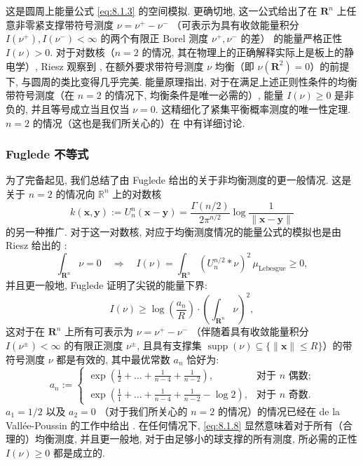 这是圆周上能量公式 \eqref{eq:8.1.3} 的空间模拟. 
更确切地, 这一公式给出了在 \(\mathbf{R}^n\) 上任意非零紧支撑带符号测度 \(\nu = \nu^+ - \nu^-\) 
（可表示为具有收敛能量积分 \(I(\nu^+), I(\nu^-) < \infty\) 的两个有限正 Borel 测度 \(\nu^+, \nu^-\) 的差） 
的能量严格正性 \(I(\nu) > 0\). 
对于对数核（\(n=2\) 的情况, 其在物理上的正确解释实际上是板上的静电学）, 
Riesz 观察到 \cite[第 I.4 节]{Rie38}, 在额外要求带符号测度 \(\nu\) 均衡（即 \(\nu(\mathbf{R}^2) = 0\)）的前提下, 
与圆周的类比变得几乎完美. 
能量原理指出, 对于在满足上述正则性条件的均衡带符号测度（在 \(n=2\) 的情况下, 均衡条件是唯一必需的）, 
能量 \(I(\nu) \geq 0\) 是非负的, 并且等号成立当且仅当 \(\nu=0\). 
这精细化了紧集平衡概率测度的唯一性定理. \(n=2\) 的情况（这也是我们所关心的）在 \cite[定理 16.4.2]{Hil62} 中有详细讨论.

\subsubsection{Fuglede 不等式}\label{sec:8.1.7}

为了完备起见, 我们总结了由 Fuglede \cite{Fug60} 给出的关于非均衡测度的更一般情况. 
这是关于 \(n=2\) 的情况向 \(\mathbb{R}^n\) 上的对数核
\[ k(\mathbf{x}, \mathbf{y}) := U_n^n(\mathbf{x} - \mathbf{y}) = \frac{\Gamma(n/2)}{2\pi^{n/2}} \log \frac{1}{\|\mathbf{x} - \mathbf{y}\|} \]
的另一种推广. 对于这一对数核, 对应于均衡测度情况的能量公式的模拟也是由 Riesz 给出的 \cite[第 I.4 节]{Rie38}:
\[ \int_{\mathbf{R}^n} \nu = 0 \quad \Longrightarrow \quad I(\nu) = \int_{\mathbf{R}^n} \left( U_n^{n/2} * \nu \right)^2 \, \mu_{\text{Lebesgue}} \ge 0, \]
并且更一般地, Fuglede \cite[第 4 节]{Fug60} 证明了尖锐的能量下界:
\begin{equation}\label{eq:8.1.8}
I(\nu) \ge \log\left(\frac{a_n}{R}\right) \cdot \left(\int_{\mathbf{R}^n} \nu\right)^2,
\end{equation}
这对于在 \(\mathbf{R}^n\) 上所有可表示为 \(\nu = \nu^+ - \nu^-\) （伴随着具有收敛能量积分 \(I(\nu^\pm) < \infty\) 的有限正测度 \(\nu^\pm\), 
且具有支撑集 \(\operatorname{supp}(\nu) \subseteq \{\|\mathbf{x}\| \leq R\}\)）的带符号测度 \(\nu\) 都是有效的, 
其中最优常数 \(a_n\) 恰好为:
\[ a_n := \begin{cases} \exp\left(\frac{1}{2} + \dots + \frac{1}{n-4} + \frac{1}{n-2}\right), & \text{对于 } n \text{ 偶数;} \\ \exp\left(\frac{1}{1} + \dots + \frac{1}{n-4} + \frac{1}{n-2} - \log 2\right), & \text{对于 } n \text{ 奇数.} \end{cases} \]
\(a_1 = 1/2\) 以及 \(a_2 = 0\) （对于我们所关心的 \(n = 2\) 的情况）的情况已经在 de la Vall{\'e}e-Poussin 的工作中给出 \cite[第 47 节]{dlVP49}. 
在任何情况下, \eqref{eq:8.1.8} 显然意味着对于所有（合理的）均衡测度, 并且更一般地, 
对于由足够小的球支撑的所有测度, 所必需的正性 \(I(\nu) \geq 0\) 都是成立的.

